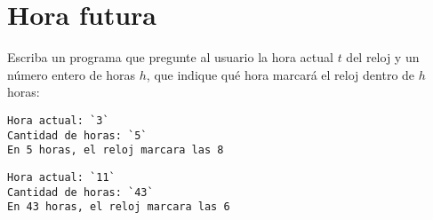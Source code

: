 \section{Hora futura}

Escriba un programa que pregunte al usuario la hora actual \(t\) del
reloj y un número entero de horas \(h\), que indique qué hora marcará
el reloj dentro de \(h\) horas:

\begin{lstlisting}[language=testcase]
Hora actual: `3`
Cantidad de horas: `5`
En 5 horas, el reloj marcara las 8
\end{lstlisting}

\begin{lstlisting}[language=testcase]
Hora actual: `11`
Cantidad de horas: `43`
En 43 horas, el reloj marcara las 6
\end{lstlisting}
